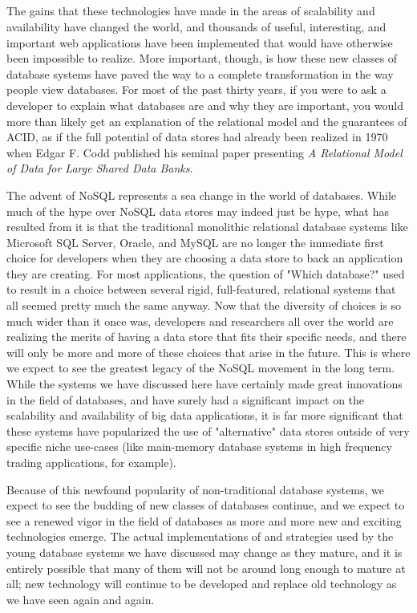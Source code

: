 \documentclass[11pt,a4paper]{report}
\begin{document}
\subsection*{}
The gains that these technologies have made in the areas of scalability and availability have changed the world, and thousands of useful, interesting, and important web applications have been implemented that would have otherwise been impossible to realize. More important, though, is how these new classes of database systems have paved the way to a complete transformation in the way people view databases. For most of the past thirty years, if you were to ask a developer to explain what databases are and why they are important, you would more than likely get an explanation of the relational model and the guarantees of ACID, as if the full potential of data stores had already been realized in 1970 when Edgar F. Codd published his seminal paper presenting \textit{A Relational Model of Data for Large Shared Data Banks}.\cite{cod70}

The advent of NoSQL represents a sea change in the world of databases. While much of the hype over NoSQL data stores may indeed just be hype, what has resulted from it is that the traditional monolithic relational database systems like Microsoft SQL Server, Oracle, and MySQL are no longer the immediate first choice for developers when they are choosing a data store to back an application they are creating. For most applications, the question of "Which database?" used to result in a choice between several rigid, full-featured, relational systems that all seemed pretty much the same anyway. Now that the diversity of choices is so much wider than it once was, developers and researchers all over the world are realizing the merits of having a data store that fits their specific needs, and there will only be more and more of these choices that arise in the future. This is where we expect to see the greatest legacy of the NoSQL movement in the long term. While the systems we have discussed here have certainly made great innovations in the field of databases, and have surely had a significant impact on the scalability and availability of big data applications, it is far more significant that these systems have popularized the use of "alternative" data stores outside of very specific niche use-cases (like main-memory database systems in high frequency trading applications, for example).

Because of this newfound popularity of non-traditional database systems, we expect to see the budding of new classes of databases continue, and we expect to see a renewed vigor in the field of databases as more and more new and exciting technologies emerge. The actual implementations of and strategies used by the young database systems we have discussed may change as they mature, and it is entirely possible that many of them will not be around long enough to mature at all; new technology will continue to be developed and replace old technology as we have seen again and again.
\end{document}
